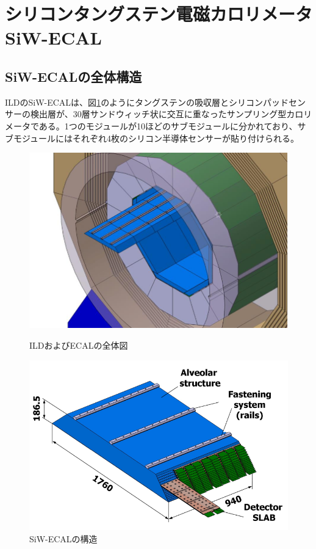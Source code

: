 \section{シリコンタングステン電磁カロリメータ SiW-ECAL}
\subsection{SiW-ECALの全体構造}
ILDのSiW-ECALは、図\ref{SiW-ECAL}のようにタングステンの吸収層とシリコンパッドセンサーの検出層が、30層サンドウィッチ状に交互に重なったサンプリング型カロリメータである。1つのモジュールが10ほどのサブモジュールに分かれており、サブモジュールにはそれぞれ4枚のシリコン半導体センサーが貼り付けられる。
\begin{figure}[h]
 \begin{minipage}[h]{.45\linewidth}
	\begin{center}
 \includegraphics[keepaspectratio, scale=0.8]
 	{Figure/Siwecal/ECAL.png}
 		\caption{ILDおよびECALの全体図}
 		\label{ECAL}
	\end{center}
\end{minipage}
\hfill
\begin{minipage}[h]{.45\linewidth}
	\begin{center}
 \includegraphics[keepaspectratio, scale=0.8]
 	{Figure/Siwecal/SiW-ECAL.png}
 		\caption{SiW-ECALの構造}
 		\label{SiW-ECAL}
	\end{center}
\end{minipage}
\end{figure}

